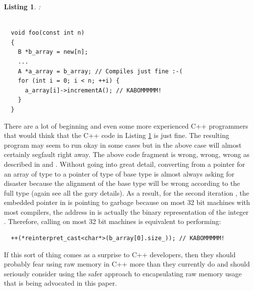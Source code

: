 \documentclass[pdf,ps2pdf,11pt]{SANDreport}
\newtheorem{listing}{Listing}
\begin{document}
\begin{listing}:\\
\label{listing:BadArrayPointerConversion}
{\small\begin{verbatim}

  void foo(const int n)
  {
    B *b_array = new[n];
    ...
    A *a_array = b_array; // Compiles just fine :-(
    for (int i = 0; i < n; ++i) {
      a_array[i]->incrementA(); // KABOMMMMM!
    }
  }

\end{verbatim}}
\end{listing}

There are a lot of beginning and even some more experienced C++
programmers that would think that the C++ code in Listing
{}\ref{listing:BadArrayPointerConversion} is just fine.  The resulting
program may seem to run okay in some cases but in the above case will
almost certainly segfault right away.  The above code fragment is
wrong, wrong, wrong as described in {}\cite[Gotcha 33]{C++Gotchas03}
and {}\cite[Item 100]{C++CodingStandards05}.  Without going into great
detail, converting from a pointer for an array of type {} to a
pointer of type of base type {} is almost always asking for
disaster because the alignment of the base type {} will be
wrong according to the full type {} (again see {}\cite[Gotcha
33]{C++Gotchas03} all the gory details).  As a result, for the second
iteration {}, the embedded pointer in
{} is pointing to garbage because on most
32 bit machines with most compilers, the address in
{} is actually the binary representation
of the integer {}.  Therefore, calling
{} on most 32 bit machines is
equivalent to performing:

{\small\begin{verbatim}
  ++(*reinterpret_cast<char*>(b_array[0].size_)); // KABOMMMMM!
\end{verbatim}}

If this sort of thing comes as a surprise to C++ developers, then they
should probably fear using raw memory in C++ more than they currently
do and should seriously consider using the safer approach to
encapsulating raw memory usage that is being advocated in this paper.
\end{document}
